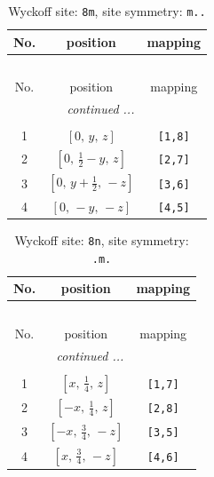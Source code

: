 \documentclass[fleqn,8pt]{jsarticle}
\begin{document}
\renewcommand{\arraystretch}{1.2}
\begin{longtable}{ccc}
\caption{Wyckoff site: {\tt 8m}, site symmetry: {\tt m..}}
 \\
 \hline \hline
No. & position & mapping \\ \hline \endfirsthead

\multicolumn{2}{l}{\tablename\ \thetable{}} \\
 \hline \hline
No. & position & mapping \\ \hline \endhead

 \hline \hline
\multicolumn{2}{r}{\footnotesize\it continued ...} \\ \endfoot

 \hline \hline
\multicolumn{2}{r}{} \\ \endlastfoot

1 & $\left[ 0,\, y,\, z \right]$ & {\tt [1,8]} \\ \hline
2 & $\left[ 0,\, \frac{1}{2} - y,\, z \right]$ & {\tt [2,7]} \\ \hline
3 & $\left[ 0,\, y + \frac{1}{2},\, - z \right]$ & {\tt [3,6]} \\ \hline
4 & $\left[ 0,\, - y,\, - z \right]$ & {\tt [4,5]} \\
\end{longtable}
\renewcommand{\arraystretch}{1.2}
\begin{longtable}{ccc}
\caption{Wyckoff site: {\tt 8n}, site symmetry: {\tt .m.}}
 \\
 \hline \hline
No. & position & mapping \\ \hline \endfirsthead

\multicolumn{2}{l}{\tablename\ \thetable{}} \\
 \hline \hline
No. & position & mapping \\ \hline \endhead

 \hline \hline
\multicolumn{2}{r}{\footnotesize\it continued ...} \\ \endfoot

 \hline \hline
\multicolumn{2}{r}{} \\ \endlastfoot

1 & $\left[ x,\, \frac{1}{4},\, z \right]$ & {\tt [1,7]} \\ \hline
2 & $\left[ - x,\, \frac{1}{4},\, z \right]$ & {\tt [2,8]} \\ \hline
3 & $\left[ - x,\, \frac{3}{4},\, - z \right]$ & {\tt [3,5]} \\ \hline
4 & $\left[ x,\, \frac{3}{4},\, - z \right]$ & {\tt [4,6]} \\
\end{longtable}
\end{document}
